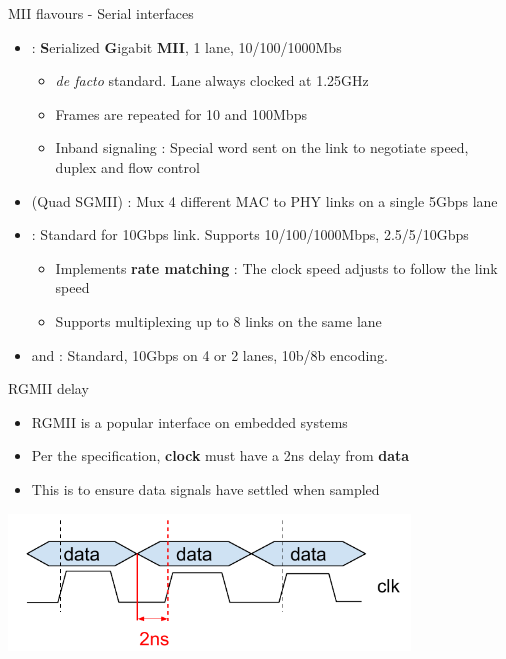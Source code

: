 \begin{frame}{MII flavours - Serial interfaces}
	\begin{itemize}
		\item {} : \textbf{S}erialized \textbf{G}igabit \textbf{MII}, 1 lane, 10/100/1000Mbs
			\begin{itemize}
				\item \textit{de facto} standard. Lane always clocked at 1.25GHz
				\item Frames are repeated for 10 and 100Mbps
				\item Inband signaling : Special word sent on the link to negotiate speed, duplex and flow control
			\end{itemize}
		\item {} (Quad SGMII) : Mux 4 different MAC to PHY links on a single 5Gbps lane
		\item {} : Standard for 10Gbps link. Supports 10/100/1000Mbps, 2.5/5/10Gbps
			\begin{itemize}
				\item Implements \textbf{rate matching} : The clock speed adjusts to follow the link speed
				\item Supports multiplexing up to 8 links on the same lane
			\end{itemize}
		\item {} and  : Standard, 10Gbps on 4 or 2 lanes, 10b/8b encoding.
	\end{itemize}
\end{frame}

\begin{frame}{RGMII delay}
		\begin{itemize}
			\item RGMII is a popular interface on embedded systems
			\item Per the specification, \textbf{clock} must have a 2ns delay from \textbf{data}
			\item This is to ensure data signals have settled when sampled
		\end{itemize}
		\begin{center}
			\includegraphics[width=0.8\textwidth]{slides/networking-driver-phy/rgmii_delays.pdf}
		\end{center}
\end{frame}

